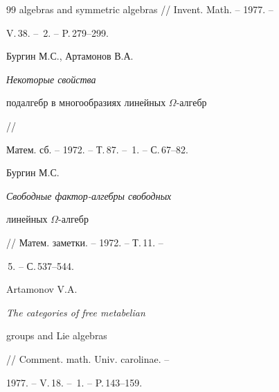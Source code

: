 \begin{thebibliography}{99}
{algebras and symmetric algebras} // Invent. Math. -- 1977. --


V.\,38. -- \No\,2. -- P.\,279--299.




Бургин М.С., Артамонов В.А. {\em Некоторые свойства


подалгебр в многообразиях линейных $\Omega$-алгебр} //


Матем. сб. -- 1972. -- Т.\,87. -- \No\,1. -- С.\,67--82.




Бургин М.С. {\em Свободные фактор-алгебры свободных


линейных $\Omega$-алгебр} // Матем. заметки. -- 1972. -- Т.\,11. --


\No\,5. -- С.\,537--544.




Artamonov V.A. {\em The categories of free metabelian


groups and Lie algebras} // Comment. math. Univ. carolinae. --


1977. -- V.\,18. -- \No\,1. -- P.\,143--159.





\end{thebibliography} 


 


\vskip 1cm 


 






 


 


